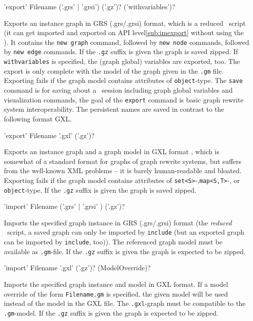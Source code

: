\begin{rail}
  'export' Filename ('.grs' | '.grsi') ('.gz')? ('withvariables')?
\end{rail}
Exports an instance graph in GRS (.grs/.grsi) format, which is a reduced \GrShell\ script
(it can get imported and exported on API level\ref{sub:imexport} without using the \GrShell).
It contains the \texttt{new graph} command, followed by \texttt{new node} commands, followed by \texttt{new edge} commands.
If the \texttt{.gz} suffix is given the graph is saved zipped.
If \texttt{withvariables} is specified, the (graph global) variables are exported, too.
The export is only complete with the model of the graph given in the \texttt{.gm} file.
Exporting fails if the graph model contains attributes of \texttt{object}-type.
The \texttt{save} command is for saving about a \GrShell\ session including graph global variables and visualization commands, 
the goal of the \texttt{export} command is basic graph rewrite system interoperability.
The persistent names are saved in contrast to the following format GXL.

\begin{rail}
  'export' Filename '.gxl' ('.gz')?
\end{rail}
Exports an instance graph and a graph model in GXL format \cite{GXL,GXL2}, 
which is somewhat of a standard format for graphs of graph rewrite systems, 
but suffers from the well-known XML problems -- it is barely human-readable and bloated.
Exporting fails if the graph model contains attributes of \texttt{set<S>}-,\texttt{map<S,T>}-, or \texttt{object}-type.
If the \texttt{.gz} suffix is given the graph is saved zipped.

\begin{rail}
  'import' Filename ('.grs' | '.grsi' ) ('.gz')?
\end{rail}
Imports the specified graph instance in GRS (.grs/.grsi) format (the \emph{reduced} \GrShell\ script,
a saved graph can only be imported by \texttt{include} (but an exported graph can be imported by \texttt{include}, too)).
The referenced graph model must be available as \texttt{.gm}-file.
If the \texttt{.gz} suffix is given the graph is expected to be zipped.

\begin{rail}
  'import' Filename '.gxl' ('.gz')? (ModelOverride)?
\end{rail}
Imports the specified graph instance and model in GXL format.
If a model override of the form \texttt{Filename.gm} is specified, the given model will be used instead of the model in the GXL file.
The \texttt{.gxl}-graph must be compatible to the \texttt{.gm}-model.
If the \texttt{.gz} suffix is given the graph is expected to be zipped.

